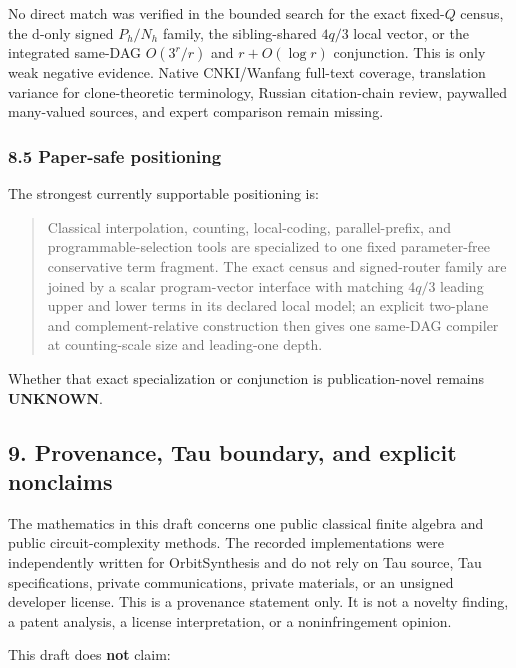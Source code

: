 \documentclass[
  11pt,
]{article}
\theoremstyle{definition}
\theoremstyle{remark}
\begin{document}
No direct match was verified in the bounded search for the exact
fixed-\(Q\) census, the d-only signed \(P_h/N_h\) family, the
sibling-shared \(4q/3\) local vector, or the integrated same-DAG
\(O(3^r/r)\) and \(r+O(\log r)\) conjunction. This is only weak negative
evidence. Native CNKI/Wanfang full-text coverage, translation variance
for clone-theoretic terminology, Russian citation-chain review,
paywalled many-valued sources, and expert comparison remain missing.

\hypertarget{paper-safe-positioning}{%
\subsubsection{8.5 Paper-safe
positioning}\label{paper-safe-positioning}}

The strongest currently supportable positioning is:

\begin{quote}
Classical interpolation, counting, local-coding, parallel-prefix, and
programmable-selection tools are specialized to one fixed parameter-free
conservative term fragment. The exact census and signed-router family
are joined by a scalar program-vector interface with matching \(4q/3\)
leading upper and lower terms in its declared local model; an explicit
two-plane and complement-relative construction then gives one same-DAG
compiler at counting-scale size and leading-one depth.
\end{quote}

Whether that exact specialization or conjunction is publication-novel
remains \textbf{UNKNOWN}.

\hypertarget{provenance-tau-boundary-and-explicit-nonclaims}{%
\subsection{9. Provenance, Tau boundary, and explicit
nonclaims}\label{provenance-tau-boundary-and-explicit-nonclaims}}

The mathematics in this draft concerns one public classical finite
algebra and public circuit-complexity methods. The recorded
implementations were independently written for OrbitSynthesis and do not
rely on Tau source, Tau specifications, private communications, private
materials, or an unsigned developer license. This is a provenance
statement only. It is not a novelty finding, a patent analysis, a
license interpretation, or a noninfringement opinion.

This draft does \textbf{not} claim:
\end{document}
